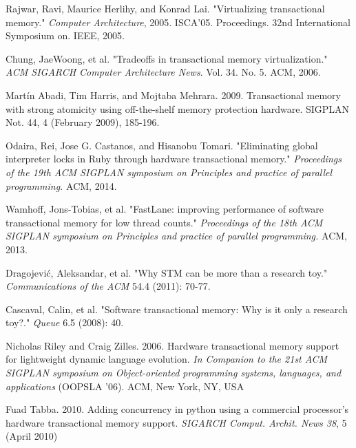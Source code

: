 \documentclass{sigplanconf}
\begin{document}
\begin{thebibliography}{}
 Rajwar, Ravi, Maurice Herlihy, and Konrad
  Lai. "Virtualizing transactional memory." \emph{Computer
    Architecture}, 2005. ISCA'05. Proceedings. 32nd International
  Symposium on. IEEE, 2005.

 Chung, JaeWoong, et al. "Tradeoffs in transactional
  memory virtualization." \emph{ACM SIGARCH Computer Architecture
  News}. Vol. 34. No. 5. ACM, 2006.

 Martín Abadi, Tim Harris, and Mojtaba
  Mehrara. 2009. Transactional memory with strong atomicity using
  off-the-shelf memory protection hardware. SIGPLAN Not. 44, 4 (February
  2009), 185-196.




  Odaira, Rei, Jose G. Castanos, and Hisanobu Tomari.  "Eliminating
  global interpreter locks in Ruby through hardware transactional
  memory."  \emph{Proceedings of the 19th ACM SIGPLAN symposium on
    Principles and practice of parallel programming.} ACM, 2014.

  Wamhoff, Jons-Tobias, et al. "FastLane: improving performance of
  software transactional memory for low thread counts."
  \emph{Proceedings of the 18th ACM SIGPLAN symposium on Principles
    and practice of parallel programming.} ACM, 2013.

  Dragojević, Aleksandar, et al. "Why STM can be more than a research
  toy." \emph{Communications of the ACM} 54.4 (2011): 70-77.

  Cascaval, Calin, et al. "Software transactional memory: Why is it
  only a research toy?." \emph{Queue} 6.5 (2008): 40.

  Nicholas Riley and Craig Zilles. 2006. Hardware transactional memory
  support for lightweight dynamic language evolution. \emph{In
    Companion to the 21st ACM SIGPLAN symposium on Object-oriented
    programming systems, languages, and applications} (OOPSLA
  '06). ACM, New York, NY, USA

  Fuad Tabba. 2010. Adding concurrency in python using a commercial
  processor's hardware transactional memory support. \emph{SIGARCH
  Comput. Archit. News 38}, 5 (April 2010)


\end{thebibliography}
\end{document}
